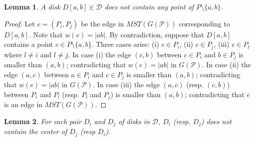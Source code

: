 \documentclass[11pt,a4paper]{article}
\newcommand{\CD}[2]{D[#1,#2]}
\newtheorem{lemma}{Lemma}
\begin{document}
\begin{lemma}
 \label{D-empty}
A disk $\CD{a}{b}\in\mathcal{D}$ does not contain any point of $P\setminus\{a,b\}$.
\end{lemma}
\begin{proof}
  Let $e=(P_i,P_j)$ be the edge in $MST(G(\mathcal{P}))$ corresponding to $\CD{a}{b}$. Note that $w(e)=|ab|$. By contradiction, suppose that $\CD{a}{b}$ contains a point $c\in P\setminus\{a,b\}$. Three cases arise: (i) $c\in P_i$, (ii) $c\in P_j$, (iii) $c\in P_l$ where $l\neq i$ and $l\neq j$. In case (i) the edge $(c,b)$ between $c\in P_i$ and $b\in P_j$ is smaller than $(a,b)$; contradicting that $w(e)=|ab|$ in $G(\mathcal{P})$.  In case (ii) the edge $(a,c)$ between $a\in P_i$ and $c\in P_j$ is smaller than $(a,b)$; contradicting that $w(e)=|ab|$ in $G(\mathcal{P})$. In case (iii) the edge $(a,c)$ (resp. $(c,b)$) between $P_i$ and $P_l$ (resp. $P_l$ and $P_j$) is smaller than $(a,b)$; contradicting that $e$ is an edge in $MST(G(\mathcal{P}))$. 
\end{proof}


\begin{lemma}
\label{center-in-lemma}
 For each pair $D_i$ and $D_j$ of disks in $\mathcal{D}$, $D_i$ (resp. $D_j$) does not contain the center of $D_j$ (resp $D_i$).
\end{lemma}
\end{document}
